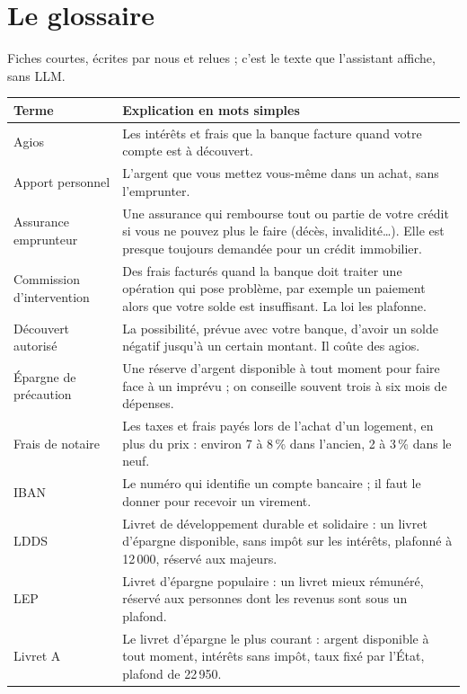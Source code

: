 \chapter{Le glossaire}
\label{an:glossaire}

Fiches courtes, écrites par nous et relues ; c'est le texte que l'assistant affiche, sans LLM.

\begin{center}\small
\begin{longtable}{@{}L{3.3cm} L{11.1cm}@{}}
\toprule
\textbf{Terme} & \textbf{Explication en mots simples} \\
\midrule
\endhead
Agios & Les intérêts et frais que la banque facture quand votre compte est à découvert. \\
Apport personnel & L'argent que vous mettez vous-même dans un achat, sans l'emprunter. \\
Assurance emprunteur & Une assurance qui rembourse tout ou partie de votre crédit si vous ne
  pouvez plus le faire (décès, invalidité\dots). Elle est presque toujours demandée pour un crédit
  immobilier. \\
Commission d'intervention & Des frais facturés quand la banque doit traiter une opération qui pose
  problème, par exemple un paiement alors que votre solde est insuffisant. La loi les plafonne. \\
Découvert autorisé & La possibilité, prévue avec votre banque, d'avoir un solde négatif jusqu'à
  un certain montant. Il coûte des agios. \\
Épargne de précaution & Une réserve d'argent disponible à tout moment pour faire face à un
  imprévu ; on conseille souvent trois à six mois de dépenses. \\
Frais de notaire & Les taxes et frais payés lors de l'achat d'un logement, en plus du prix :
  environ 7 à 8\,\% dans l'ancien, 2 à 3\,\% dans le neuf. \\
IBAN & Le numéro qui identifie un compte bancaire ; il faut le donner pour recevoir un virement. \\
LDDS & Livret de développement durable et solidaire : un livret d'épargne disponible, sans impôt
  sur les intérêts, plafonné à 12\,000\eur{}, réservé aux majeurs. \\
LEP & Livret d'épargne populaire : un livret mieux rémunéré, réservé aux personnes dont les
  revenus sont sous un plafond. \\
Livret A & Le livret d'épargne le plus courant : argent disponible à tout moment, intérêts sans
  impôt, taux fixé par l'État, plafond de 22\,950\eur{}. \\

\end{longtable}
\end{center}
